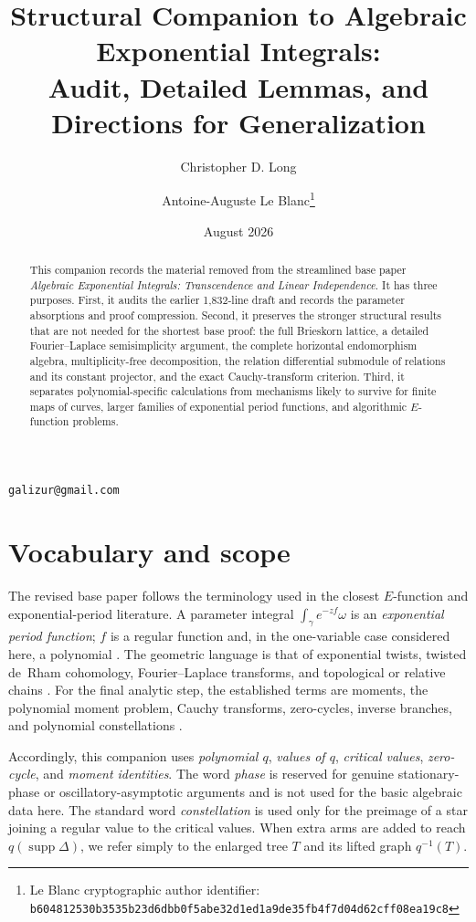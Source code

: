 \documentclass[11pt]{article}
\title{Structural Companion to Algebraic Exponential Integrals:\\
Audit, Detailed Lemmas, and Directions for Generalization}
\author{Christopher D. Long \and Antoine-Auguste Le Blanc\thanks{Le Blanc cryptographic author identifier: \texttt{b6048125\allowbreak{}30b3535b\allowbreak{}23d6dbb0\allowbreak{}f5abe32d\allowbreak{}1ed1a9de\allowbreak{}35fb4f7d\allowbreak{}04d62cff\allowbreak{}08ea19c8}}}
\date{August 2026}
\numberwithin{equation}{section}
\theoremstyle{definition}
\theoremstyle{remark}
\begin{document}
\maketitle

\begin{center}
\small
\texttt{galizur@gmail.com}
\end{center}

\begin{abstract}
This companion records the material removed from the streamlined base paper
\emph{Algebraic Exponential Integrals: Transcendence and Linear
Independence}.  It has three purposes.  First, it audits the earlier
1,832-line draft and records the parameter absorptions and proof compression.
Second, it preserves the stronger structural results that are not needed for
the shortest base proof: the full Brieskorn lattice, a detailed
Fourier--Laplace semisimplicity argument, the complete horizontal
endomorphism algebra, multiplicity-free decomposition, the relation
differential submodule of relations and its constant projector, and the exact
Cauchy-transform criterion.  Third, it separates polynomial-specific
calculations from mechanisms likely to survive for finite maps of curves,
larger families of exponential period functions, and algorithmic
$E$-function problems.
\end{abstract}

\tableofcontents

\section{Vocabulary and scope}

The revised base paper follows the terminology used in the closest
$E$-function and exponential-period literature.  A parameter integral
$\int_\gamma e^{-zf}\omega$ is an \emph{exponential period function}; $f$
is a regular function and, in the one-variable case considered here, a
polynomial \cite{FresanJossen,CommelinHabeggerHuber}.  The geometric language
is that of exponential twists, twisted de~Rham cohomology,
Fourier--Laplace transforms, and topological or relative chains
\cite{HienRoucairol,SabbahYu}.  For the final analytic step, the established
terms are moments, the polynomial moment problem, Cauchy transforms,
zero-cycles, inverse branches, and polynomial constellations
\cite{PakovichMuzychuk,GavrilovPakovich}.

Accordingly, this companion uses \emph{polynomial $q$}, \emph{values of
$q$}, \emph{critical values}, \emph{zero-cycle}, and \emph{moment
identities}.  The word \emph{phase} is reserved for genuine stationary-phase
or oscillatory-asymptotic arguments and is not used for the basic algebraic
data here.  The standard word \emph{constellation} is used only for the preimage
of a star joining a regular value to the critical values.  When extra arms
are added to reach $q(\operatorname{supp}\Delta)$, we refer simply to the
enlarged tree $T$ and its lifted graph $q^{-1}(T)$.
\end{document}
